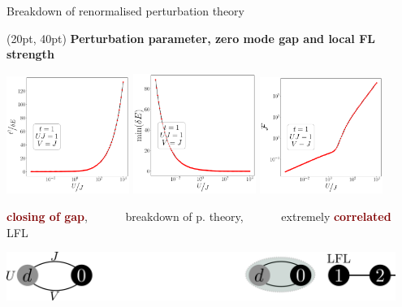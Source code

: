 \documentclass[aspectratio=169]{beamer}
\newcommand{\head}[1]{
\begin{textblock*}{\textwidth}(20pt, 40pt)
\textbf{\Large {#1}}
\end{textblock*}
}
\newcommand{\focus}[1]{\textcolor{maroon}{\textbf{#1}}}
\begin{document}
\begin{frame}[noframenumbering]{Breakdown of renormalised perturbation theory}

\head{Perturbation parameter, zero mode gap and local FL strength}

\vspace*{25pt}
{
\centering
\includegraphics[width=0.3\textwidth]{figures/par-t=1.000,J=1_over_U,V=J,N=4,U=0.016,100.000,95.pdf}
\hspace*{\fill}
\includegraphics[width=0.3\textwidth]{figures/gap-t=1.000,J=1_over_U,V=J,N=4,U=0.016,100.000,95.pdf}
\hspace*{\fill}
\includegraphics[width=0.3\textwidth]{figures/lfl-t=1.000,J=1_over_U,V=J,N=4,U=0.016,100.000,95.pdf}

\focus{closing of gap},~ ~ ~ ~ breakdown of p. theory,~ ~ ~ ~  extremely \focus{correlated} LFL

\vspace*{5pt}
\includegraphics[width=0.95\textwidth]{figures/gap_lfl.pdf}
}

\end{frame}
\end{document}
